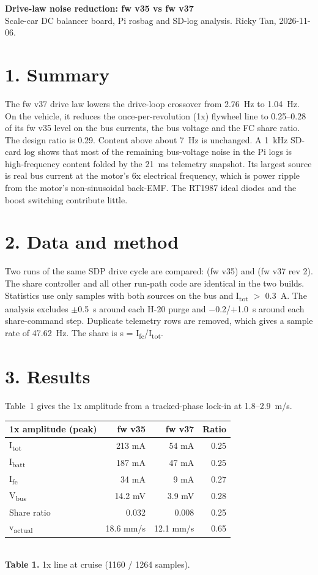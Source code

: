 \documentclass[10pt]{article}
\newcommand{\Itot}{I\textsubscript{tot}}
\newcommand{\Vbus}{V\textsubscript{bus}}
\begin{document}
{\Large\bfseries Drive-law noise reduction: fw v35 vs fw v37}\\[0.3em]
{\small Scale-car DC balancer board, Pi rosbag and SD-log analysis. Ricky Tan, 2026-11-06.}

\section*{1. Summary}
The fw v37 drive law lowers the drive-loop crossover from 2.76~Hz to 1.04~Hz. On the vehicle, it
reduces the once-per-revolution (1x) flywheel line to 0.25--0.28 of its fw v35 level on the bus
currents, the bus voltage and the FC share ratio. The design ratio is 0.29. Content above about
7~Hz is unchanged. A 1~kHz SD-card log shows that most of the remaining bus-voltage noise in the
Pi logs is high-frequency content folded by the 21~ms telemetry snapshot. Its largest source is
real bus current at the motor's 6x electrical frequency, which is power ripple from the motor's
non-sinusoidal back-EMF. The RT1987 ideal diodes and the boost switching contribute little.

\section*{2. Data and method}
Two runs of the same SDP drive cycle are compared: 
(fw v35) and  (fw v37 rev 2). The share controller and
all other run-path code are identical in the two builds. Statistics use only samples with both
sources on the bus and \Itot{} $>$ 0.3~A. The analysis excludes $\pm$0.5~s around each H-20 purge
and $-$0.2/$+$1.0~s around each share-command step. Duplicate telemetry rows are removed, which
gives a sample rate of 47.62~Hz. The share is s = I\textsubscript{fc}/\Itot.

\section*{3. Results}
Table~1 gives the 1x amplitude from a tracked-phase lock-in at 1.8--2.9~m/s.

\begin{center}
\small
\begin{tabular}{lrrr}
\toprule
1x amplitude (peak) & fw v35 & fw v37 & Ratio \\
\midrule
\Itot & 213 mA & 54 mA & 0.25 \\
I\textsubscript{batt} & 187 mA & 47 mA & 0.25 \\
I\textsubscript{fc} & 34 mA & 9 mA & 0.27 \\
\Vbus & 14.2 mV & 3.9 mV & 0.28 \\
Share ratio & 0.032 & 0.008 & 0.25 \\
v\textsubscript{actual} & 18.6 mm/s & 12.1 mm/s & 0.65 \\
\bottomrule
\end{tabular}\\[0.3em]
\textbf{Table 1.} 1x line at cruise (1160 / 1264 samples).
\end{center}
\end{document}
